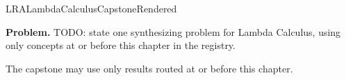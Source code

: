 \ifcsname LRALambdaCalculusCapstoneRendered\endcsname
\else
\expandafter\gdef\csname LRALambdaCalculusCapstoneRendered\endcsname{}

\newpage
{}
\label{cap:lambda-calculus}

\begin{tcolorbox}[
  colback=gray!6,
  colframe=gray!40,
  arc=2pt,
  left=8pt, right=8pt, top=6pt, bottom=6pt,
  title={\small\textbf{Capstone Problem}},
  fonttitle=\small\bfseries
]
\textbf{Problem.}
TODO: state one synthesizing problem for Lambda Calculus, using only concepts at or
before this chapter in the registry.
\end{tcolorbox}

\begin{remark*}
The capstone may use only results routed at or before this chapter.
\end{remark*}

\clearpage
\fi
